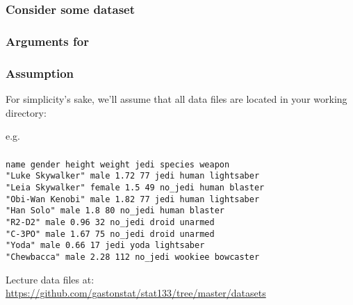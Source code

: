 \documentclass[12pt]{beamer}\usepackage[]{graphicx}\usepackage[]{color}
\begin{document}

\begin{frame}[fragile]
\frametitle{Consider some dataset}
\begin{center}
\end{center}
\end{frame}


\begin{frame}[fragile]
\frametitle{Arguments for }
\begin{center}
\end{center}
\end{frame}


\begin{frame}
\frametitle{Assumption}

For simplicity's sake, we'll assume that all data files are located in your working directory:

\bigskip
e.g. 

\end{frame}


\begin{frame}[fragile]
\frametitle{}

{\small
\begin{verbatim}
name gender height weight jedi species weapon
"Luke Skywalker" male 1.72 77 jedi human lightsaber
"Leia Skywalker" female 1.5 49 no_jedi human blaster
"Obi-Wan Kenobi" male 1.82 77 jedi human lightsaber
"Han Solo" male 1.8 80 no_jedi human blaster
"R2-D2" male 0.96 32 no_jedi droid unarmed
"C-3PO" male 1.67 75 no_jedi droid unarmed
"Yoda" male 0.66 17 jedi yoda lightsaber
"Chewbacca" male 2.28 112 no_jedi wookiee bowcaster
\end{verbatim}
}

{\scriptsize Lecture data files at: \\
\url{https://github.com/gastonstat/stat133/tree/master/datasets}}
\end{frame}

\end{document}
